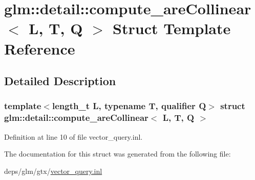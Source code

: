 \hypertarget{structglm_1_1detail_1_1compute__areCollinear}{}\section{glm\+:\+:detail\+:\+:compute\+\_\+are\+Collinear$<$ L, T, Q $>$ Struct Template Reference}
\label{structglm_1_1detail_1_1compute__areCollinear}


\subsection{Detailed Description}
\subsubsection*{template$<$length\+\_\+t L, typename T, qualifier Q$>$\newline
struct glm\+::detail\+::compute\+\_\+are\+Collinear$<$ L, T, Q $>$}



Definition at line 10 of file vector\+\_\+query.\+inl.



The documentation for this struct was generated from the following file\+:\begin{DoxyCompactItemize}
\item 
deps/glm/gtx/\hyperlink{vector__query_8inl}{vector\+\_\+query.\+inl}\end{DoxyCompactItemize}
